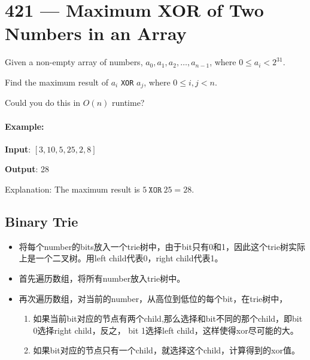 \section{421 --- Maximum XOR of Two Numbers in an Array}
Given a non-empty array of numbers, $a_0, a_1, a_2, \ldots, a_{n-1}$, where $0 \leq a_i < 2^{31}$.

Find the maximum result of $a_i$ \texttt{XOR} $a_j$, where $0 \leq i, j < n$.

Could you do this in $O(n)$ runtime?

\paragraph{Example:}

\begin{flushleft}
\textbf{Input}: $[3, 10, 5, 25, 2, 8]$

\textbf{Output}: 28

Explanation: The maximum result is $5\ \texttt{XOR}\ 25 = 28$.
\end{flushleft}

\subsection{Binary Trie}
\begin{itemize}
\item 将每个number的bits放入一个trie树中，由于bit只有0和1，因此这个trie树实际上是一个二叉树。用left child代表0，right child代表1。
\item 首先遍历数组，将所有number放入trie树中。
\item 再次遍历数组，对当前的number，从高位到低位的每个bit，在trie树中，
\begin{enumerate}
\item 如果当前bit对应的节点有两个child,那么选择和bit不同的那个child，即bit 0选择right child，反之， bit 1选择left child，这样使得xor尽可能的大。
\item 如果bit对应的节点只有一个child，就选择这个child，计算得到的xor值。
\end{enumerate}
\end{itemize}


